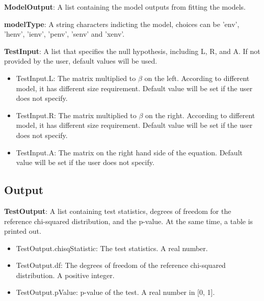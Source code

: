 \documentclass[a4paper,11pt,openany]{memoir}
\begin{document}
\begin{par}
\textbf{ModelOutput}: A list containing the model outputs from fitting the models.
\end{par} \vspace{1em}
\begin{par}
\textbf{modelType}: A string characters indicting the model, choices can be 'env', 'henv', 'ienv', 'penv', 'senv' and 'xenv'.
\end{par} \vspace{1em}
\begin{par}
\textbf{TestInput}: A list that specifies the null hypothesis, including L, R, and A.  If not provided by the user, default values will be used.
\end{par} \vspace{1em}
\begin{itemize}
\setlength{\itemsep}{-1ex}
   \item TestInput.L: The matrix multiplied to $\beta$ on the left.  According to different model, it has different size requirement.  Default value will be set if the user does not specify.
\end{itemize}
\begin{itemize}
\setlength{\itemsep}{-1ex}
   \item TestInput.R: The matrix multiplied to $\beta$ on the right.  According to different model, it has different size requirement.  Default value will be set if the user does not specify.
\end{itemize}
\begin{itemize}
\setlength{\itemsep}{-1ex}
   \item TestInput.A: The matrix on the right hand side of the equation.  Default value will be set if the user does not specify.
\end{itemize}


\subsection*{Output}

\begin{par}
\textbf{TestOutput}: A list containing test statistics, degrees of freedom for the reference chi-squared distribution, and the p-value.  At the same time, a table is printed out.
\end{par} \vspace{1em}
\begin{itemize}
\setlength{\itemsep}{-1ex}
   \item TestOutput.chisqStatistic: The test statistics. A real number.
   \item TestOutput.df: The degrees of freedom of the reference chi-squared distribution.  A positive integer.
   \item TestOutput.pValue: p-value of the test.  A real number in [0, 1].
\end{itemize}
\end{document}
